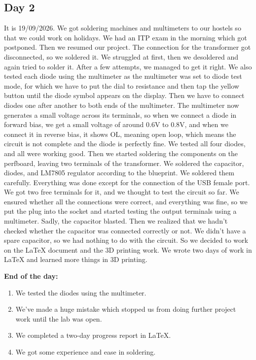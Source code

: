 \documentclass[11pt, a4paper]{article}
\begin{document}
\subsection*{Day 2}
It is 19/09/2026. We got soldering machines and multimeters to our hostels so that we could work on holidays. We had an ITP exam in the morning which got
postponed. Then we resumed our project. The connection for the transformer got disconnected, so we soldered it. We struggled at first, then we desoldered
and again tried to solder it. After a few attempts, we managed to get it right. We also tested each diode using the multimeter as the multimeter was
set to diode test mode, for which we have to put the dial to resistance and then tap the yellow button until the diode symbol appears on the display.
Then we have to connect diodes one after another to both ends of the multimeter. The multimeter now generates a small voltage across its terminals,
so when we connect a diode in forward bias, we get a small voltage of around 0.6V to 0.8V, and when we connect it in reverse bias, it shows OL, meaning open loop,
which means the circuit is not complete and the diode is perfectly fine. We tested all four diodes, and all were working good. Then we started soldering the components on the perfboard, leaving
two terminals of the transformer. We soldered the capacitor, diodes, and LM7805 regulator according to the blueprint. We soldered them carefully. Everything was done 
except for the connection of the USB female port. We got two free terminals for it, and we thought to test the circuit so far. We ensured whether all the connections 
were correct, and everything was fine, so we put the plug into the socket and started testing the output terminals using a multimeter. Sadly, the capacitor blasted. Then 
we realized that we hadn't checked whether the capacitor was connected correctly or not. We didn't have a spare capacitor, so we had nothing to do with the circuit. 
So we decided to work on the LaTeX document and the 3D printing work. We wrote two days of work in LaTeX and learned more things in 3D printing.

\noindent\textbf{End of the day:}
\begin{enumerate}
    \item We tested the diodes using the multimeter.
    \item We've made a huge mistake which stopped us from doing further project work until the lab was open.
    \item We completed a two-day progress report in LaTeX.
    \item We got some experience and ease in soldering.
\end{enumerate}
\end{document}
